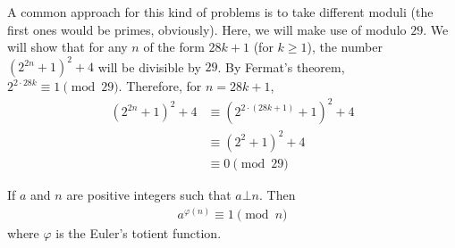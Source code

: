 \documentclass{subfile}
\begin{document}
		\begin{solution}
			A common approach for this kind of problems is to take different moduli (the first ones would be primes, obviously). Here, we will make use of modulo $29$. We will show that for any $n$ of the form $28k+1$ (for $k \geq 1$), the number $(2^{2n}+1 )^2+4$ will be divisible by $29$. By Fermat's theorem, $2^{2 \cdot 28k} \equiv 1 \pmod{29}$. Therefore, for $n=28k+1$,
				\begin{align*}
					(2^{2n}+1 )^2+4 &\equiv (2^{2\cdot (28k+1)}+1 )^2+4\\
									&\equiv (2^{2}+1 )^2+4\\
									&\equiv 0 \pmod{29}
				\end{align*}

		\end{solution}

		\begin{theorem}
			If $a$ and $n$ are positive integers such that $a \bot n$. Then
			\begin{align*}
				a^{\varphi(n)} \equiv 1 \pmod n
			\end{align*}
			where $\varphi$ is the Euler's totient function.
		\end{theorem}
\end{document}
